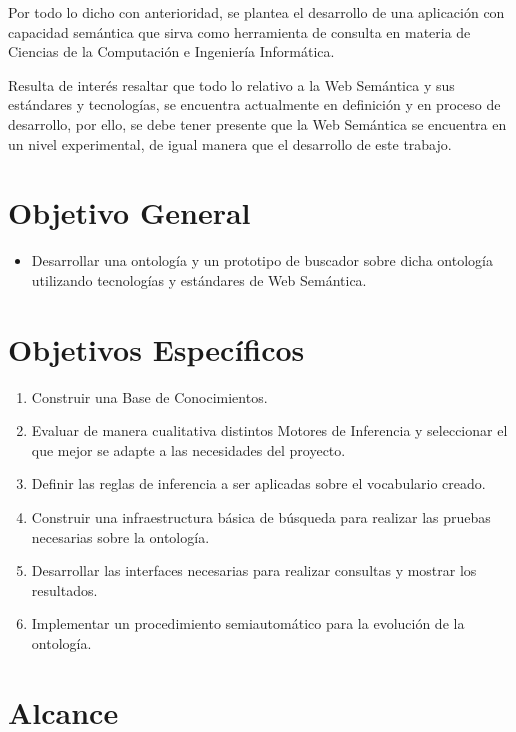 Por todo lo dicho con anterioridad, se plantea el desarrollo de una aplicación con capacidad semántica que sirva como herramienta de consulta en materia de Ciencias de la Computación e Ingeniería Informática.

Resulta de interés resaltar que todo lo relativo a la Web Semántica y sus estándares y tecnologías, se encuentra actualmente en definición y en proceso de desarrollo, por ello, se debe tener presente que la Web Semántica se encuentra en un nivel experimental, de igual manera que el desarrollo de este trabajo.

\newpage


\section{Objetivo General}

\begin{itemize}
\item Desarrollar una ontología y un prototipo de buscador sobre dicha ontología utilizando tecnologías y estándares de Web Semántica.
\end{itemize}

\section{Objetivos Específicos }

\begin{enumerate}
    \item Construir una Base de Conocimientos.
    \item Evaluar de manera cualitativa distintos Motores de Inferencia y seleccionar el que mejor se adapte a las necesidades del proyecto.
    \item Definir las reglas de inferencia a ser aplicadas sobre el vocabulario creado.
    \item Construir una infraestructura básica de búsqueda para realizar las pruebas necesarias sobre la ontología.
    \item Desarrollar las interfaces necesarias para realizar consultas y mostrar los resultados.
    \item Implementar un procedimiento semiautomático para la evolución de la ontología.
\end{enumerate}


\section{Alcance }

